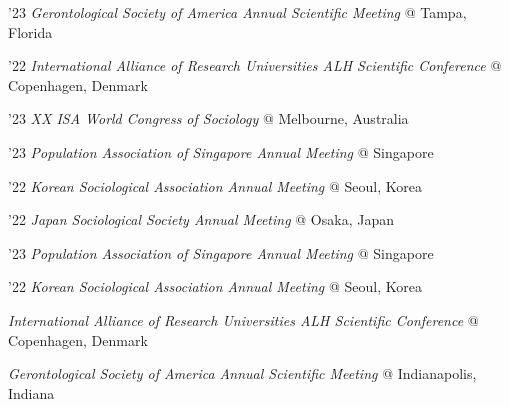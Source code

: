 \begin{aka}
    \item [2022--2023]
    \begin{akb}
        \item '23 \textit{Gerontological Society of America Annual Scientific Meeting} @ Tampa, Florida
        \item '22 \textit{International Alliance of Research Universities ALH Scientific Conference} @ Copenhagen, Denmark
    \end{akb}

    \item [2022--2023]
    \begin{akb}
        \item '23 \textit{XX ISA World Congress of Sociology} @ Melbourne, Australia
        \item '23 \textit{Population Association of Singapore Annual Meeting} @ Singapore
        \item '22 \textit{Korean Sociological Association Annual Meeting} @ Seoul, Korea
        \item '22 \textit{Japan Sociological Society Annual Meeting} @ Osaka, Japan
    \end{akb}

    \item [2022--2023]
    \begin{akb}
        \item '23 \textit{Population Association of Singapore Annual Meeting} @ Singapore
        \item '22 \textit{Korean Sociological Association Annual Meeting} @ Seoul, Korea
    \end{akb}

    \item [2022]
    \begin{akb}
        \item \textit{International Alliance of Research Universities ALH Scientific Conference} @ Copenhagen, Denmark
    \end{akb}

    \item [2022]
    \begin{akb}
        \item \textit{Gerontological Society of America Annual Scientific Meeting} @ Indianapolis, Indiana
    \end{akb}


\end{aka}
